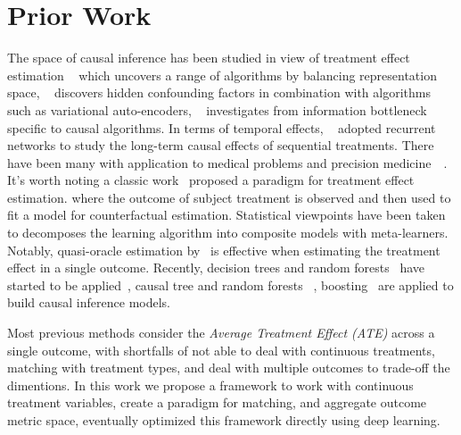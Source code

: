 \documentclass{article}
\begin{document}
\section{Prior Work} 
\label{sec:related_work} 

The space of causal inference has been studied in view of treatment effect estimation ~\cite{shalit2017estimating} which uncovers a range of algorithms by balancing representation space, ~\cite{louizos2017causal} discovers hidden confounding factors in combination with algorithms such as variational auto-encoders, ~\cite{parbhoo2018causal} investigates from information bottleneck specific to causal algorithms. In terms of temporal effects, ~\cite{lim2018forecasting} adopted recurrent networks to study the long-term causal effects of sequential treatments. There have been many with application to medical problems and precision medicine~\cite{shalit2017estimating}~\cite{lim2018forecasting}. It's worth noting a classic work~\cite{rubin1974estimating} proposed a paradigm for treatment effect estimation. where the outcome of subject treatment is observed and then used to fit a model for counterfactual estimation. Statistical viewpoints have been taken ~\cite{kunzel2017meta} to decomposes the learning algorithm into composite models with meta-learners. Notably, quasi-oracle estimation by~\cite{nie2017quasi} is effective when estimating the treatment effect in a single outcome. Recently, decision trees and random forests~\cite{chen2016xgboost} have started to be applied~\cite{rzepakowski2012decision}, causal tree and random forests~\cite{wager2017estimation} , boosting~\cite{powers2017some} are applied to build causal inference models. 

Most previous methods consider the \emph{Average Treatment Effect (ATE)} across a single outcome, with shortfalls of not able to deal with continuous treatments, matching with treatment types, and deal with multiple outcomes to trade-off the dimentions. In this work we propose a framework to work with continuous treatment variables, create a paradigm for matching, and aggregate outcome metric space, eventually optimized this framework directly using deep learning. 
\end{document}
